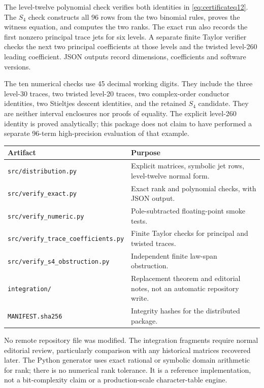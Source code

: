 \documentclass[11pt]{article}
\numberwithin{equation}{section}
\theoremstyle{definition}\newtheorem{definition}[theorem]{Definition}
\theoremstyle{remark}\newtheorem{remark}[theorem]{Remark}
\newcommand{\code}[1]{\texttt{\small #1}}
\begin{document}
The level-twelve polynomial check verifies both identities in
\eqref{eq:certificateq12}. The $S_4$ check constructs all 96 rows from the
two binomial rules, proves the witness equation, and computes the two ranks.
The exact run also records the first nonzero principal trace jets for six
levels. A separate finite Taylor verifier checks the next two principal
coefficients at those levels and the twisted level-260 leading coefficient.
JSON outputs record dimensions, coefficients and software versions.

The ten numerical checks use 45 decimal working digits. They include the
three level-30 traces, two twisted level-20 traces, two complex-order
conductor identities, two Stieltjes descent identities, and the retained
$S_4$ candidate. They are neither interval enclosures nor proofs of equality.
The explicit level-260 identity is proved analytically; this package does
not claim to have performed a separate 96-term high-precision evaluation
of that example.

\begin{center}
\begin{tabular}{p{}p{}}
\toprule
Artifact & Purpose\\\midrule
\code{src/distribution.py} & Explicit matrices, symbolic jet rows, level-twelve normal form.\\
\code{src/verify\_exact.py} & Exact rank and polynomial checks, with JSON output.\\
\code{src/verify\_numeric.py} & Pole-subtracted floating-point smoke tests.\\
\code{src/verify\_trace\_coefficients.py} & Finite Taylor checks for principal and twisted traces.\\
\code{src/verify\_s4\_obstruction.py} & Independent finite law-span obstruction.\\
\code{integration/} & Replacement theorem and editorial notes, not an automatic repository write.\\
\code{MANIFEST.sha256} & Integrity hashes for the distributed package.\\\bottomrule
\end{tabular}
\end{center}

No remote repository file was modified. The integration fragments require
normal editorial review, particularly comparison with any historical
matrices recovered later. The Python generator uses exact rational or
symbolic domain arithmetic for rank; there is no numerical rank tolerance.
It is a reference implementation, not a bit-complexity claim or a
production-scale character-table engine.
\end{document}
